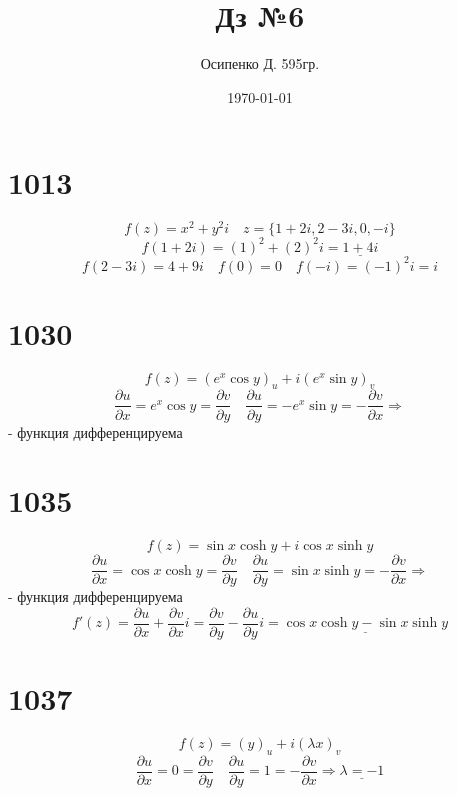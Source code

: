 \documentclass[a4paper, 12pt]{article}
\title{Дз №6}
\author{Осипенко Д. 595гр.}
\date{\today}
\begin{document}
\sffamily
\maketitle
\section*{1013}
\[
	f(z)=x^2+y^2i  \quad z = \{1+2i,2-3i,0,-i\}
\]
\[
	f(1+2i) = (1)^2 + (2)^2i = \underline{1 + 4i}	
\]
\[
	f(2-3i) = 4 + 9i \quad f(0) = 0 \quad f(-i) = (-1)^2i = i
\]
\section*{1030}
\[
	f(z) = (e^x\cos y)_u + i(e^x \sin y)_v
\]
\[
	\frac{\partial u}{\partial x} = e^x\cos y = \frac{\partial v}{\partial y} \quad \frac{\partial u}{\partial y} = -e^x\sin y = -\frac{\partial v}{\partial x} \Rightarrow
\]
- функция дифференцируема

\section*{1035}
\[
	f(z) = \sin x \cosh y + i\cos x \sinh y
\]
\[
	\frac{\partial u}{\partial x} = \cos x \cosh y = \frac{\partial v}{\partial y} \quad \frac{\partial u}{\partial y} = \sin x \sinh y = -\frac{\partial v}{\partial x} \Rightarrow
\]
- функция дифференцируема
\[
	f'(z) = \frac{\partial u}{\partial x} + \frac{\partial v}{\partial x}i = \frac{\partial v}{\partial y} - \frac{\partial u}{\partial y}i = \underline{\cos x\cosh y - \sin x\sinh y}
\]
\section*{1037}
\[
	f(z) = (y)_u + i(\lambda x)_v
\]
\[
	\frac{\partial u}{\partial x} = 0 = \frac{\partial v}{\partial y} \quad \frac{\partial u}{\partial y} = 1 = -\frac{\partial v}{\partial x} \Rightarrow \underline{\lambda = -1}
\]
\end{document}
